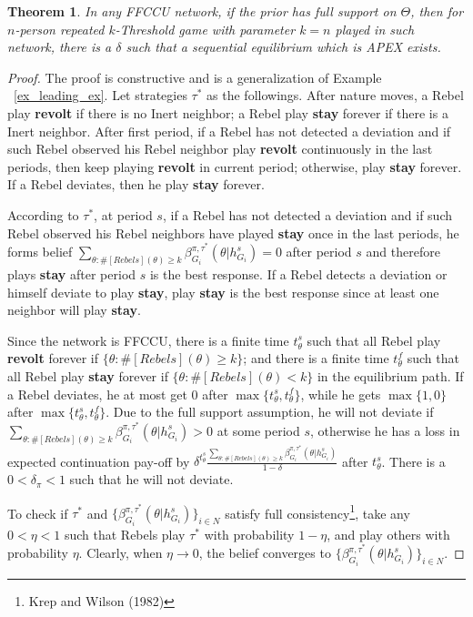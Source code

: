 \documentclass[12pt,letter]{article}
\newtheorem{theorem}{Theorem}
\theoremstyle{definition}
\theoremstyle{remark}
\theoremstyle{claim}
\begin{document}
\begin{theorem}
\label{prop:not_crowded}
In any FFCCU network, if the prior has full support on $\Theta$, then for $n$-person repeated $k$-Threshold game with parameter $k=n$ played in such network,  there is a $\delta$ such that a sequential equilibrium which is APEX exists.
\end{theorem}
\begin{proof}
The proof is constructive and is a generalization of Example ~\ref{ex_leading_ex}. Let strategies $\tau^{*}$ as the followings. After nature moves, a Rebel play \textbf{revolt}  if there is no Inert neighbor; a Rebel play \textbf{stay} forever if there is a Inert neighbor. After first period, if a Rebel has not detected a deviation and if such Rebel observed his Rebel neighbor play \textbf{revolt} continuously in the last periods, then keep playing \textbf{revolt} in current period; otherwise, play \textbf{stay} forever. If a Rebel deviates, then he play \textbf{stay} forever.

According to $\tau^{*}$, at period $s$, if a Rebel has not detected a deviation and if such Rebel observed his Rebel neighbors have played \textbf{stay} once in the last periods, he forms belief $\sum_{\theta:\#[Rebels](\theta)\geq k}\beta^{\pi,\tau^*}_{G_i}(\theta|h^{s}_{G_i})=0$ after period $s$ and therefore plays \textbf{stay} after period $s$ is the best response. If a Rebel detects a deviation or himself deviate to play \textbf{stay}, play \textbf{stay} is the best response since at least one neighbor will play \textbf{stay}. 

Since the network is FFCCU, there is a finite time $t^{s}_{\theta}$ such that all Rebel play \textbf{revolt} forever if $\{\theta: \#[Rebels](\theta)\geq k\}$; and there is a finite time $t^f_{\theta}$ such that all Rebel play \textbf{stay} forever if $\{\theta: \#[Rebels](\theta)< k\}$ in the equilibrium path. If a Rebel deviates, he at most get 0 after $\max\{t^{s}_{\theta},t^f_{\theta}\}$, while he gets $\max\{1,0\}$ after $\max\{t^{s}_{\theta},t^f_{\theta}\}$. Due to the full support assumption, he will not deviate if $\sum_{\theta:\#[Rebels](\theta)\geq k}\beta^{\pi,\tau^*}_{G_i}(\theta|h^{s}_{G_i})>0$ at some period $s$, otherwise he has a loss in expected continuation pay-off by $\delta^{t^s_{\theta}}\frac{\sum_{\theta:\#[Rebels](\theta)\geq k}\beta^{\pi,\tau^*}_{G_i}(\theta|h^{s}_{G_i})}{1-\delta}$ after $t^s_{\theta}$. There is a $0<\delta_{\pi}<1$ such that he will not deviate.

To check if $\tau^{*}$ and $\{\beta^{\pi,\tau^*}_{G_i}(\theta|h^{s}_{G_i})\}_{i\in N}$ satisfy full consistency\footnote{Krep and Wilson (1982)}, take any $0<\eta<1$ such that Rebels play $\tau^{*}$ with probability $1-\eta$, and play others with probability $\eta$. Clearly, when $\eta \rightarrow 0$, the belief converges to $\{\beta^{\pi,\tau^*}_{G_i}(\theta|h^{s}_{G_i})\}_{i\in N}$.
\end{proof}
\end{document}
